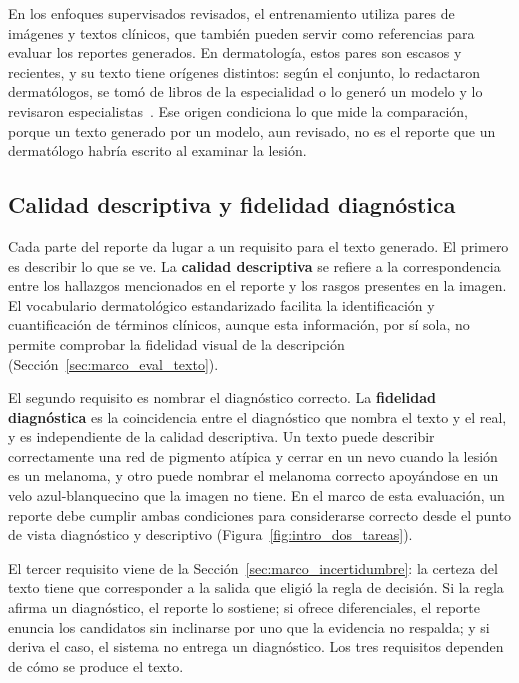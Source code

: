 En los enfoques supervisados revisados, el entrenamiento utiliza pares de imágenes y textos clínicos, que también pueden servir como referencias para evaluar los reportes generados. En dermatología, estos pares son escasos y
recientes, y su texto tiene orígenes distintos: según el conjunto, lo redactaron dermatólogos, se tomó de libros
de la especialidad o lo generó un modelo y lo revisaron especialistas~\cite{shen2025skincare,zeng2025mmskin,yan2025derm1miccv}.
Ese origen condiciona lo que mide la comparación, porque un texto generado por un modelo, aun revisado, no es el
reporte que un dermatólogo habría escrito al examinar la lesión.

\subsection{Calidad descriptiva y fidelidad diagnóstica}
\label{sec:marco_rep_ejes}

Cada parte del reporte da lugar a un requisito para el texto generado. El primero es describir lo que se ve.
La \textbf{calidad descriptiva} se refiere a la correspondencia entre los hallazgos mencionados en el reporte y los rasgos presentes en la imagen. El vocabulario dermatológico estandarizado facilita la identificación y cuantificación de términos clínicos, aunque esta información, por sí sola, no permite comprobar la fidelidad visual de la descripción (Sección~\ref{sec:marco_eval_texto}).

El segundo requisito es nombrar el diagnóstico correcto. La \textbf{fidelidad diagnóstica} es la coincidencia
entre el diagnóstico que nombra el texto y el real, y es independiente de la calidad descriptiva. Un texto
puede describir correctamente una red de pigmento atípica y cerrar en un nevo cuando la lesión es un melanoma,
y otro puede nombrar el melanoma correcto apoyándose en un velo azul-blanquecino que la imagen no tiene. En el marco de esta evaluación, un reporte debe cumplir ambas condiciones para considerarse correcto desde el punto de vista diagnóstico y descriptivo (Figura~\ref{fig:intro_dos_tareas}).



El tercer requisito viene de la Sección~\ref{sec:marco_incertidumbre}: la certeza del texto tiene que
corresponder a la salida que eligió la regla de decisión. Si la regla afirma un diagnóstico, el reporte lo
sostiene; si ofrece diferenciales, el reporte enuncia los candidatos sin inclinarse por uno que la evidencia no
respalda; y si deriva el caso, el sistema no entrega un diagnóstico. Los tres requisitos dependen de cómo se
produce el texto.

